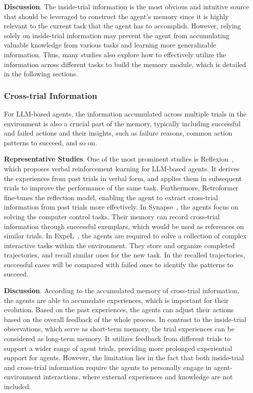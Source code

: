 \documentclass{article}
\theoremstyle{definition}
\theoremstyle{theorem}
\theoremstyle{proof}
\theoremstyle{remark}
\begin{document}
	\textbf{Discussion}.
	The inside-trial information is the most obvious and intuitive source that should be leveraged to construct the agent's memory since it is highly relevant to the current task that the agent has to accomplish. However, relying solely on inside-trial information may prevent the agent from accumulating valuable knowledge from various tasks and learning more generalizable information.
	Thus, many studies also explore how to effectively utilize the information across different tasks to build the memory module, which is detailed in the following sections.
	
	\subsubsection{Cross-trial Information}
	For LLM-based agents, the information accumulated across multiple trials in the environment is also a crucial part of the memory, typically including successful and failed actions and their insights, such as failure reasons, common action patterns to succeed, and so on. 
	
	\textbf{Representative Studies}.
	One of the most prominent studies is Reflexion~\cite{reflexion}, which proposes verbal reinforcement learning for LLM-based agents. It derives the experiences from past trials in verbal form, and applies them in subsequent trials to improve the performance of the same task.
	Furthermore, Retroformer~\cite{retroformer} fine-tunes the reflection model, enabling the agent to extract cross-trial information from past trials more effectively.
	In Synapse~\cite{synapse}, the agents focus on solving the computer control tasks. Their memory can record cross-trial information through successful exemplars, which would be used as references on similar trials. In ExpeL~\cite{expel}, the agents are required to solve a collection of complex interactive tasks within the environment.
	They store and organize completed trajectories, and recall similar ones for the new task. In the recalled trajectories, successful cases will be compared with failed ones to identify the patterns to succeed.
	
	\textbf{Discussion}.
	According to the accumulated memory of cross-trial information, the agents are able to accumulate experiences, which is important for their evolution.
	Based on the past experiences, the agents can adjust their actions based on the overall feedback of the whole process. In contrast to the inside-trial observations, which serve as short-term memory, the trial experiences can be considered as long-term memory. It utilizes feedback from different trials to support a wider range of agent trials, providing more prolonged experiential support for agents.
	However, the limitation lies in the fact that both inside-trial and cross-trial information require the agents to personally engage in agent-environment interactions, where external experiences and knowledge are not included.
	
\end{document}

